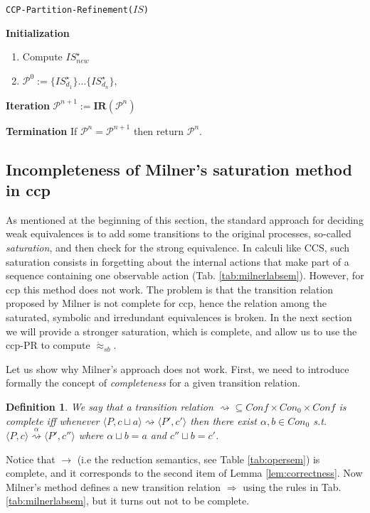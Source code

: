 \documentclass[copyright,creativecommons]{eptcs}
\newcommand{\rrarrow}{\longrightarrow}
\newcommand{\Con}{\mathit{Con}}
\newcommand{\pairccp}[2]{\langle #1,#2 \rangle}
\newcommand{\trans}[1]{\stackrel{#1}{\rrarrow}}
\newcommand{\wsatbis}{\dot{\approx}_{sb}}
\newtheorem{definition}{Definition}
\newcommand{\newtrans}[1]{\stackrel{#1}{\Longrightarrow}}
\newcommand{\gentrans}[1]{\stackrel{#1}{\rightsquigarrow}}
\newcommand{\A}{\alpha}
\newcommand{\conf}[2]{\pairccp{#1}{#2}}
\newcommand{\lub}{\sqcup}
\newcommand{\Conf}{\mathit{Conf}}
\begin{document}
\begin{algorithm}\caption{\texttt{CCP-Partition-Refinement($IS$)}}\label{algo:ccp}
\textbf{Initialization}
\begin{enumerate}
\item Compute $IS_{new}^{\star}$ \item $\mathcal{P}^0:=\{IS^{\star}_{d_1}\}\dots \{IS^{\star}_{d_n}\}$,
\end{enumerate}
\textbf{Iteration} $\mathcal{P}^{n+1}:=\mathbf{IR}(\mathcal{P}^n)$

\textbf{Termination} If $\mathcal{P}^n=\mathcal{P}^{n+1}$ then return $\mathcal{P}^n$.
\end{algorithm}

\subsection{Incompleteness of Milner's saturation method in ccp} \label{ssec:CExMilner}

As mentioned at the beginning of this section, the standard approach for
deciding weak equivalences is to add some transitions to the original processes,
so-called \emph{saturation}, and then check for the strong equivalence.
In calculi like CCS, such saturation consists in forgetting
about the internal actions that make part of a sequence containing
one observable action (Tab. \ref{tab:milnerlabsem}).
However, for ccp this method does not work.
The problem is that the transition relation proposed by Milner is not complete
for ccp, hence the relation among the saturated, symbolic and irredundant equivalences
is broken. In the next section we will provide a stronger saturation, which
is complete, and allow us to use the ccp-PR to compute $\wsatbis$.

Let us show why Milner's approach does not work.
First, we need to introduce formally the concept of \emph{completeness}
for a given transition relation.

\begin{definition}
\label{def:completeness}
We say that a transition relation $\gentrans{} \subseteq \Conf \times \Con_0 \times \Conf$ is complete
iff whenever $\conf{P}{c \lub a} \gentrans{} \conf{P'}{c'}$ then there exist $\A, b \in \Con_0$ s.t.
$\conf{P}{c} \gentrans{\A} \conf{P'}{c''}$ where $\A \lub b = a$ and $c'' \lub b = c'$.
\end{definition}

Notice that $\trans{}$ (i.e the reduction semantics, see Table \ref{tab:opersem})
is complete, and it corresponds to the second item of Lemma \ref{lem:correctness}.
Now Milner's method defines a new transition relation  $\newtrans{}$ using the rules in
Tab. \ref{tab:milnerlabsem}, but it turns out not to be complete.
\end{document}
